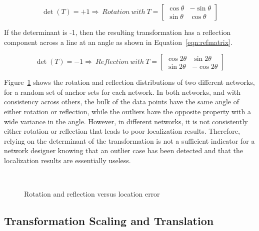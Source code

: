 \begin{equation}
	\det{(T)}=+1 \Rightarrow ~Rotation ~with ~T=
	\begin{bmatrix}
	\cos{\theta} & -\sin{\theta} \\ 
	\sin{\theta} & \cos{\theta}\end{bmatrix}
	\label{eqn:rotmatrix} 
\end{equation}

If the determinant is -1, then the resulting transformation has a reflection component across a line at an angle as shown in Equation~\ref{eqn:refmatrix}. 

\begin{equation}
	\det{(T)}=-1 \Rightarrow ~Reflection ~with ~T=
	\begin{bmatrix}
	\cos{2{\theta}} & \sin{2{\theta}} \\ 
	\sin{2{\theta}} & -\cos{2{\theta}}\end{bmatrix}
	\label{eqn:refmatrix} 
\end{equation}

Figure~\ref{fig:rotref} shows the rotation and reflection distributions of two different networks, for a random set of anchor sets for each network.  In both networks, and with consistency across others, the bulk of the data points have the same angle of either rotation or reflection, while the outliers have the opposite property with a wide variance in the angle.  However, in different networks, it is not consistently either rotation or reflection that leads to poor localization results.  Therefore, relying on the determinant of the transformation is not a sufficient indicator for a network designer knowing that an outlier case has been detected and that the localization results are essentially useless.

\begin{figure}
  \centering
\\
	\caption{Rotation and reflection versus location error}	
	\label{fig:rotref}
\end{figure}

\subsection{Transformation Scaling and Translation}

